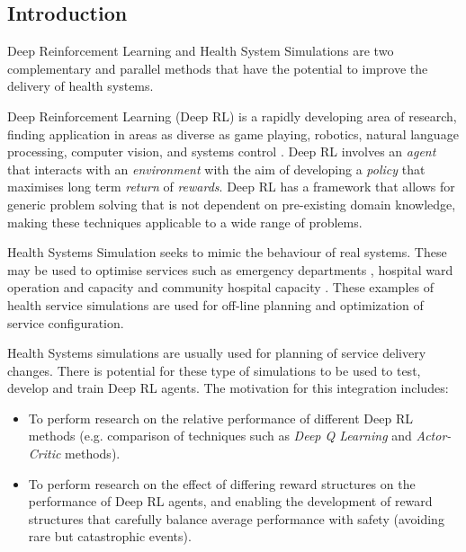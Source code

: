 \documentclass{article}
\begin{document}
\begin{multicols}{2}

\section{Introduction}

Deep Reinforcement Learning and Health System Simulations are two complementary and parallel methods that have the potential to improve the delivery of health systems.

Deep Reinforcement Learning (Deep RL) is a rapidly developing area of research, finding application in areas as diverse as game playing, robotics, natural language processing, computer vision, and systems control \cite{li_deep_2018}. Deep RL involves an \emph{agent} that interacts with an \emph{environment} with the aim of developing a \emph{policy} that maximises long term \emph{return} of \emph{rewards}. Deep RL has a framework that allows for generic problem solving that is not dependent on pre-existing domain knowledge, making these techniques applicable to a wide range of problems.

Health Systems Simulation seeks to mimic the behaviour of real systems. These may be used to optimise services such as emergency departments \cite{monks_using_2017}, hospital ward operation and capacity \cite{penn_towards_2020} and community hospital capacity  \cite{monks_modelling_2016}. These examples of health service simulations are used for off-line planning and optimization of service configuration. 

Health Systems simulations are usually used for planning of service delivery changes. There is potential for these type of simulations to be used to test, develop and train Deep RL agents. The motivation for this integration includes:

\begin{itemize}

    \item To perform research on the relative performance of different Deep RL methods (e.g. comparison of techniques such as \emph{Deep Q Learning} and \emph{Actor-Critic} methods).
    
    \item To perform research on the effect of differing reward structures on the performance of Deep RL agents, and enabling the development of reward structures that carefully balance average performance with safety (avoiding rare but catastrophic events). 
    

\end{itemize}
\end{multicols}
\end{document}
